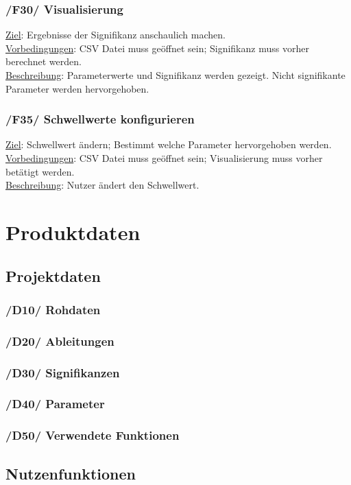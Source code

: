\documentclass{article}
\begin{document}
\subsubsection*{/F30/ Visualisierung}
\underline{Ziel}: Ergebnisse der Signifikanz anschaulich machen. \\
\underline{Vorbedingungen}: CSV Datei muss geöffnet sein; Signifikanz muss vorher berechnet werden. \\
\underline{Beschreibung}: Parameterwerte und Signifikanz werden gezeigt. Nicht signifikante Parameter werden hervorgehoben.
\subsubsection*{/F35/ Schwellwerte konfigurieren}
\underline{Ziel}: Schwellwert ändern; Bestimmt welche Parameter hervorgehoben werden. \\
\underline{Vorbedingungen}: CSV Datei muss geöffnet sein; Visualisierung muss vorher betätigt werden. \\
\underline{Beschreibung}: Nutzer ändert den Schwellwert.


\section{Produktdaten}
\subsection{Projektdaten}
\subsubsection*{/D10/ Rohdaten}
\subsubsection*{/D20/ Ableitungen}
\subsubsection*{/D30/ Signifikanzen}
\subsubsection*{/D40/ Parameter}
\subsubsection*{/D50/ Verwendete Funktionen}
\subsection{Nutzenfunktionen}
\end{document}
